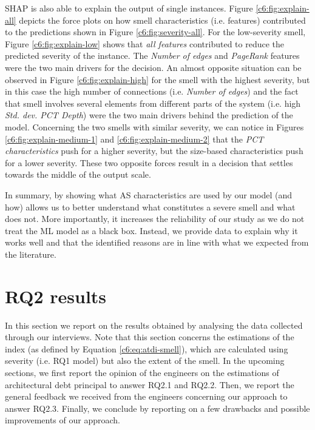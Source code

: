SHAP is also able to explain the output of single instances.
Figure \ref{c6:fig:explain-all} depicts the force plots on how smell characteristics (i.e. features) contributed to the predictions shown in Figure \ref{c6:fig:severity-all}.
For the low-severity smell, Figure \ref{c6:fig:explain-low} shows that  \emph{all features} contributed to reduce the predicted severity of the instance.
The \emph{Number of edges} and \emph{PageRank} features were the two main drivers for the decision.
An almost opposite situation can be observed in Figure \ref{c6:fig:explain-high} for the smell with the highest severity, but in this case the high number of connections (i.e. \emph{Number of edges}) and the fact that smell involves several elements from different parts of the system (i.e. high \emph{Std. dev. PCT Depth}) were the two main drivers behind the prediction of the model. 
Concerning the two smells with similar severity, we can notice in Figures \ref{c6:fig:explain-medium-1} and \ref{c6:fig:explain-medium-2} that the \emph{PCT characteristics} push for a higher severity, but the size-based characteristics push for a lower severity.
These two opposite forces result in a decision that settles towards the middle of the output scale.

In summary, by showing what AS characteristics are used by our model (and how) allows us to better understand what constitutes a severe smell and what does not.
More importantly, it increases the reliability of our study as we do not treat the ML model as a black box. 
Instead, we provide data to explain why it works well and that the identified reasons are in line with what we expected from the literature.


\section{RQ2 results}\label{c6:sec:rq2-results}
In this section we report on the results obtained by analysing the data collected through our interviews.
Note that this section concerns the estimations of the index (as defined by Equation \ref{c6:eq:atdi-smell}), which are calculated using severity (i.e. RQ1 model) but also the extent of the smell.
In the upcoming sections, we first report the opinion of the engineers on the estimations of architectural debt principal to answer RQ2.1 and RQ2.2.
Then, we report the general feedback we received from the engineers concerning our approach to answer RQ2.3.
Finally, we conclude by reporting on a few drawbacks and possible improvements of our approach.

